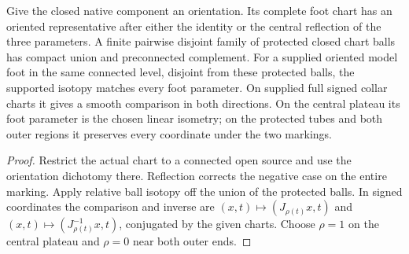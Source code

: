 \begin{proposition}
\label{prop:ed03-relative-foot-collar}
\leanok
Give the closed native component an orientation. Its complete foot chart
has an oriented representative after either the identity or the central
reflection of the three parameters. A finite pairwise disjoint family of
protected closed chart balls has compact union and preconnected complement.
For a supplied oriented model foot in the same connected level, disjoint
from these protected balls, the supported isotopy matches every foot
parameter. On supplied full signed collar charts it gives a smooth
comparison in both directions. On the central plateau its foot parameter
is the chosen linear isometry; on the protected tubes and both outer
regions it preserves every coordinate under the two markings.
\end{proposition}
\begin{proof}
\leanok
Restrict the actual chart to a connected open source and use the
orientation dichotomy there. Reflection corrects the negative case on
the entire marking. Apply relative ball isotopy off the union of the
protected balls. In signed coordinates the comparison and inverse are
$(x,t)\mapsto(J_{\rho(t)}x,t)$ and $(x,t)\mapsto(J_{\rho(t)}^{-1}x,t)$,
conjugated by the given charts. Choose $\rho=1$ on the central plateau
and $\rho=0$ near both outer ends.
\end{proof}

